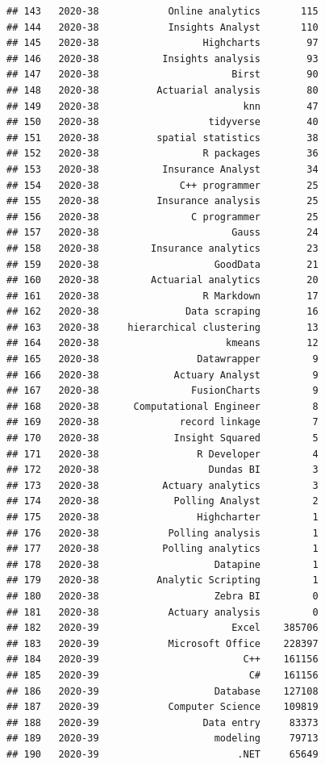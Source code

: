 \documentclass[
]{article}
\begin{document}
\begin{verbatim}
## 143   2020-38            Online analytics       115
## 144   2020-38            Insights Analyst       110
## 145   2020-38                  Highcharts        97
## 146   2020-38           Insights analysis        93
## 147   2020-38                       Birst        90
## 148   2020-38          Actuarial analysis        80
## 149   2020-38                         knn        47
## 150   2020-38                   tidyverse        40
## 151   2020-38          spatial statistics        38
## 152   2020-38                  R packages        36
## 153   2020-38           Insurance Analyst        34
## 154   2020-38              C++ programmer        25
## 155   2020-38          Insurance analysis        25
## 156   2020-38                C programmer        25
## 157   2020-38                       Gauss        24
## 158   2020-38         Insurance analytics        23
## 159   2020-38                    GoodData        21
## 160   2020-38         Actuarial analytics        20
## 161   2020-38                  R Markdown        17
## 162   2020-38               Data scraping        16
## 163   2020-38     hierarchical clustering        13
## 164   2020-38                      kmeans        12
## 165   2020-38                 Datawrapper         9
## 166   2020-38             Actuary Analyst         9
## 167   2020-38                FusionCharts         9
## 168   2020-38      Computational Engineer         8
## 169   2020-38              record linkage         7
## 170   2020-38             Insight Squared         5
## 171   2020-38                 R Developer         4
## 172   2020-38                   Dundas BI         3
## 173   2020-38           Actuary analytics         3
## 174   2020-38             Polling Analyst         2
## 175   2020-38                 Highcharter         1
## 176   2020-38            Polling analysis         1
## 177   2020-38           Polling analytics         1
## 178   2020-38                    Datapine         1
## 179   2020-38          Analytic Scripting         1
## 180   2020-38                    Zebra BI         0
## 181   2020-38            Actuary analysis         0
## 182   2020-39                       Excel    385706
## 183   2020-39            Microsoft Office    228397
## 184   2020-39                         C++    161156
## 185   2020-39                          C#    161156
## 186   2020-39                    Database    127108
## 187   2020-39            Computer Science    109819
## 188   2020-39                  Data entry     83373
## 189   2020-39                    modeling     79713
## 190   2020-39                        .NET     65649

\end{verbatim}
\end{document}
